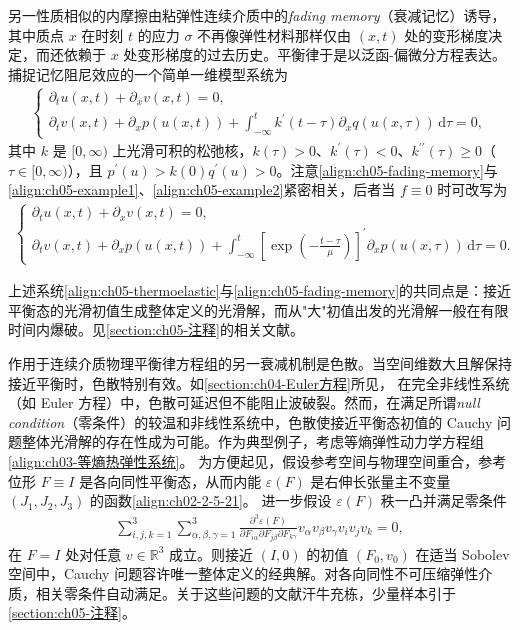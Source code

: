 \documentclass[../../main.tex]{subfiles}
\begin{document}
另一性质相似的内摩擦由粘弹性连续介质中的\emph{fading memory}（衰减记忆）诱导，其中质点 $x$ 在时刻 $t$ 的应力 $\sigma$ 不再像弹性材料那样仅由 $(x,t)$ 处的变形梯度决定，而还依赖于 $x$ 处变形梯度的过去历史。平衡律于是以泛函-偏微分方程表达。捕捉记忆阻尼效应的一个简单一维模型系统为
\begin{align}
\begin{cases}
\partial_{t}u(x,t)+\partial_{x}v(x,t)=0,\\
\partial_{t}v(x,t)+\partial_{x}p(u(x,t))+\int_{-\infty}^{t}k^{\prime}(t-\tau)\partial_{x}q(u(x,\tau))\,\mathrm{d}\tau=0,
\end{cases}\label{align:ch05-fading-memory}
\end{align}
其中 $k$ 是 $[0,\infty)$ 上光滑可积的松弛核，$k(\tau)>0$、$k^{\prime}(\tau)<0$、$k^{\prime\prime}(\tau)\geqslant0$（$\tau\in[0,\infty)$），且 $p^{\prime}(u)>k(0)q^{\prime}(u)>0$。注意\eqref{align:ch05-fading-memory}与\eqref{align:ch05-example1}、\eqref{align:ch05-example2}紧密相关，后者当 $f\equiv0$ 时可改写为
\begin{align}
\begin{cases}
\partial_{t}u(x,t)+\partial_{x}v(x,t)=0,\\
\partial_{t}v(x,t)+\partial_{x}p(u(x,t))+\int_{-\infty}^{t}\left[\exp\left(-\frac{t-\tau}{\mu}\right)\right]^{\prime}\partial_{x}p(u(x,\tau))\,\mathrm{d}\tau=0.
\end{cases}\label{align:ch05-fading-memory2}
\end{align}

上述系统\eqref{align:ch05-thermoelastic}与\eqref{align:ch05-fading-memory}的共同点是：接近平衡态的光滑初值生成整体定义的光滑解，而从"大"初值出发的光滑解一般在有限时间内爆破。见\cref{section:ch05-注释}的相关文献。

作用于连续介质物理平衡律方程组的另一衰减机制是色散。当空间维数大且解保持接近平衡时，色散特别有效。如\cref{section:ch04-Euler方程}所见，
在完全非线性系统（如 Euler 方程）中，色散可延迟但不能阻止波破裂。然而，在满足所谓\emph{null condition}（零条件）的较温和非线性系统中，色散使接近平衡态初值的 Cauchy 问题整体光滑解的存在性成为可能。作为典型例子，考虑等熵弹性动力学方程组\eqref{align:ch03-等熵热弹性系统}。
为方便起见，假设参考空间与物理空间重合，参考位形 $F\equiv I$ 是各向同性平衡态，从而内能 $\varepsilon(F)$ 是右伸长张量主不变量 $(J_{1},J_{2},J_{3})$ 的函数\eqref{align:ch02-2-5-21}。
进一步假设 $\varepsilon(F)$ 秩一凸并满足零条件
\begin{align}
\sum_{i,j,k=1}^{3}\sum_{\alpha,\beta,\gamma=1}^{3}\frac{\partial^{3}\varepsilon(F)}{\partial F_{i\alpha}\partial F_{j\beta}\partial F_{k\gamma}}v_{\alpha}v_{\beta}v_{\gamma}v_{i}v_{j}v_{k}=0,\label{align:ch05-null-condition}
\end{align}
在 $F=I$ 处对任意 $v\in\mathbb{R}^{3}$ 成立。则接近 $(I,0)$ 的初值 $(F_{0},v_{0})$ 在适当 Sobolev 空间中，Cauchy 问题容许唯一整体定义的经典解。对各向同性不可压缩弹性介质，相关零条件自动满足。关于这些问题的文献汗牛充栋，少量样本引于\cref{section:ch05-注释}。
\end{document}
